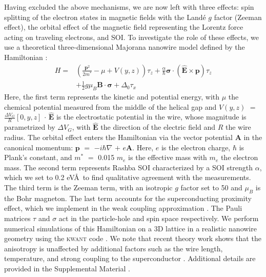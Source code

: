 Having excluded the above mechanisms, we are now left with three effects: spin splitting of the electron \mbox{states} in magnetic fields with the Land\'e $g$ factor (Zeeman eff\mbox{ect)}, the orbital effect of the magnetic field representing the Lorentz force acting on traveling electrons, and SOI.
To investigate the role of these effects, we use a theoretical three-dimensional Majorana nanowire model defined by the Hamiltonian \cite{Lutchyn2010,Oreg2010,Nijholt2016}:
\begin{equation*}
\begin{split}
H = &\left(\frac{\mathbf{p}^2}{2m^*}-\mu+V(y,z)\right) \tau_z + \frac{\alpha}{\hbar} \boldsymbol{\sigma} \cdot \mathbf{(\hat{E}\times p)} \tau_z\\
&+ \frac{1}{2}g\mu_B\mathbf{B\cdot}\boldsymbol{\sigma}+\Delta_0 \tau_x
\end{split}
\end{equation*}
Here, the first term represents the kinetic and potential energy, with $\mu$ the chemical potential measured from the middle of the helical gap and $V(y,z)$ $=$ $\frac{\Delta V_G}{R}[0,y,z]$ $\cdot$ $\mathbf{\hat{E}}$ is the electrostatic potential in the wire, whose magnitude is parametrized by $\Delta V_G$, with $\mathbf{\hat{E}}$ the direction of the electric field and $R$ the wire radius.
The orbital effect enters the Hamiltonian via the vector potential $\mathbf{A}$ in the canonical momentum: $\mathbf{p}$ $=$ $-i\hbar \nabla$ $+$ $e\mathbf{A}$.
Here, $e$ is the electron charge, $\hbar$ is Plank's constant, and $m^*$ $=$ 0.015 $m_e$ is the effective mass with $m_e$ the electron mass.
The second term represents Rashba SOI characterized by a SOI strength $\alpha$, which we set to 0.2 eV\AA\ to find qualitative agreement with the measurements.
The third term is the Zeeman term, with an isotropic $g$ factor set to 50 and $\mu_B$ is the Bohr magneton.
The last term accounts for the superconducting proximity effect, which we implement in the weak coupling approximation \cite{Nijholt2016}.
The Pauli matrices $\tau$ and $\sigma$ act in the particle-hole and spin space respectively.
We perform numerical simulations of this Hamiltonian on a 3D lattice in a realistic nanowire geometry using the \textsc{kwant} code \cite{Groth2014}.
We note that recent theory work shows that the anisotropy is unaffected by additional factors such as the wire length, temperature, and strong coupling to the superconductor \cite{Liu2019}.
Additional details are provided in the Supplemental Material \cite{Note1}.  %

